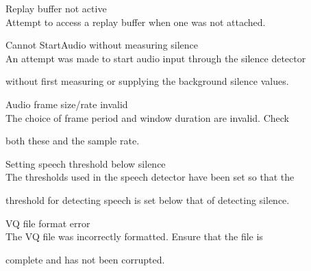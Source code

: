 \begin{itemize}





\begin{itemize}


    Replay buffer not active\\


        Attempt to access a replay buffer when one was not attached.





    Cannot StartAudio without measuring silence\\


        An attempt was made to start audio input through the silence detector 


        without first measuring or supplying the background silence values.





    Audio frame size/rate invalid\\


        The choice of frame period and window duration are invalid.  Check


        both these and the sample rate.





    Setting speech threshold below silence\\


        The thresholds used in the speech detector have been set so that the


        threshold for detecting speech is set below that of detecting silence.





\end{itemize}










\begin{itemize}


    VQ file format error\\


        The VQ file was incorrectly formatted.  Ensure that the file is 


        complete and has not been corrupted.






\end{itemize}
\end{itemize}
